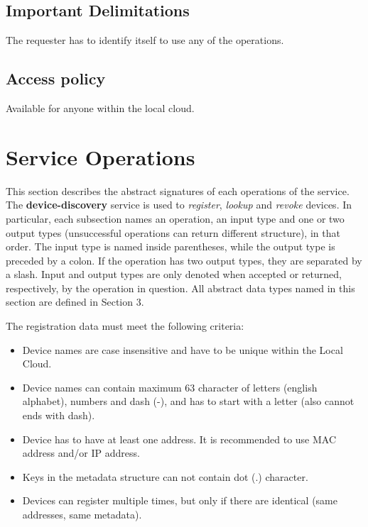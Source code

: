 \documentclass[a4paper]{arrowhead}
\begin{document}
\subsection{Important Delimitations}
\label{sec:delimitations}

The requester has to identify itself to use any of the operations.

\subsection{Access policy}
\label{sec:accesspolicy}

Available for anyone within the local cloud.

\newpage

\section{Service Operations}
\label{sec:functions}

This section describes the abstract signatures of each operations of the service. The \textbf{device-discovery} service is used to \textit{register}, \textit{lookup} and \textit{revoke} devices.
In particular, each subsection names an operation, an input type and one or two output types (unsuccessful operations can return different structure), in that order.
The input type is named inside parentheses, while the output type is preceded by a colon. If the operation has two output types, they are separated by a slash.
Input and output types are only denoted when accepted or returned, respectively, by the operation in question. All abstract data types named in this section are defined in Section 3.


The registration data must meet the following criteria:

\begin{itemize}
    \item Device names are case insensitive and have to be unique within the Local Cloud.
    \item Device names can contain maximum 63 character of letters (english alphabet), numbers and dash (-), and has to start with a letter (also cannot ends with dash).
    \item Device has to have at least one address. It is recommended to use MAC address and/or IP address.
    \item Keys in the metadata structure can not contain dot (.) character.
    \item Devices can register multiple times, but only if there are identical (same addresses, same metadata).
\end{itemize}
\end{document}
